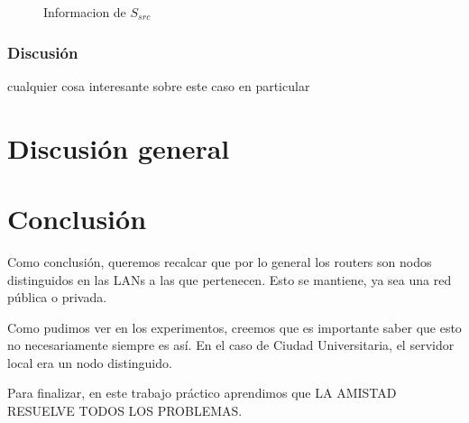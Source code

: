\documentclass[10pt, a4paper]{article}
\begin{document}
\begin{figure}[H]
\begin{minipage}{0.5\linewidth}
    \caption{Informacion de $S_{src}$}\label{fig:Fede-src-info}
  \end{minipage}
\end{figure}

\subsubsection{Discusión}

cualquier cosa interesante sobre este caso en particular

\section{Discusión general}

\section{Conclusión}
Como conclusión, queremos recalcar que por lo general los routers son nodos distinguidos en las LANs a las que pertenecen. Esto se mantiene, ya sea una red pública o privada.

Como pudimos ver en los experimentos, creemos que es importante saber que esto no necesariamente siempre es así. En el caso de Ciudad Universitaria, el servidor local era un nodo distinguido.

Para finalizar, en este trabajo práctico aprendimos que LA AMISTAD RESUELVE TODOS LOS PROBLEMAS.
\end{document}
